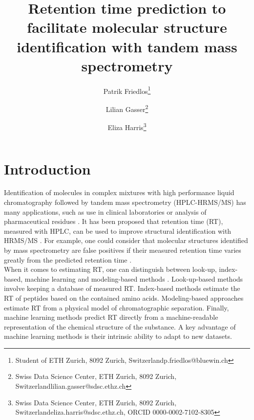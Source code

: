 \documentclass{article}
\title{Retention time prediction to facilitate molecular structure identification with tandem mass spectrometry}
\author{Patrik Friedlos\thanks{Student of ETH Zurich, 8092 Zurich, Switzerland\newline\indent\indent p.friedlos@bluewin.ch}\\
  \and Lilian Gasser\thanks{Swiss Data Science Center, ETH Zurich, 8092 Zurich, Switzerland\newline\indent\indent lilian.gasser@sdsc.ethz.ch}
   \and Eliza Harris\thanks{Swiss Data Science Center, ETH Zurich, 8092 Zurich, Switzerland\newline\indent\indent eliza.harris@sdsc.ethz.ch, ORCID 0000-0002-7102-8305}
}
\begin{document}
\maketitle


\section{Introduction}

Identification of molecules in complex mixtures with high performance liquid chromatography followed by tandem mass spectrometry (HPLC-HRMS/MS) has many applications, such as use in clinical laboratories or analysis of pharmaceutical residues \cite{van2012role, petrovic2005liquid}. It has been proposed that retention time (RT), measured with HPLC, can be used to improve structural identification with HRMS/MS \cite{strittmatter2004application}. For example, one could consider that molecular structures identified by mass spectrometry are false positives if their measured retention time varies greatly from the predicted retention time \cite{yang2021prediction}.\\

When it comes to estimating RT, one can distinguish between look-up, index-based, machine learning and modeling-based methods \cite{moruz2017peptide}. Look-up-based methods involve keeping a database of measured RT. Index-based methods estimate the RT of peptides based on the contained amino acids. Modeling-based approaches estimate RT from a physical model of chromatographic separation. Finally, machine learning methods predict RT directly from a machine-readable representation of the chemical structure of the substance. A key advantage of machine learning methods is their intrinsic ability to adapt to new datasets.\\
\end{document}
